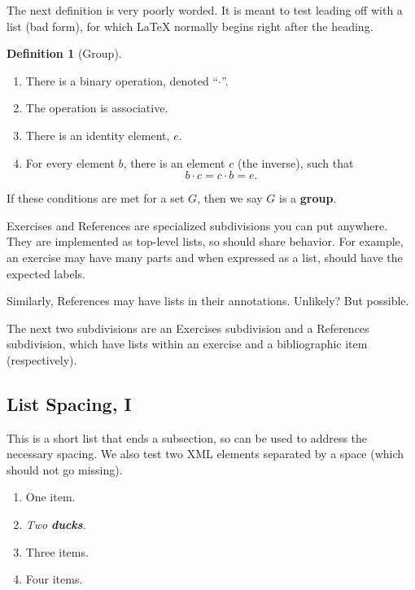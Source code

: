 \documentclass[10pt,]{article}
\newcommand{\alert}[1]{\textbf{\textit{#1}}}
\newcommand{\terminology}[1]{\textbf{#1}}
\theoremstyle{plain}
\theoremstyle{definition}
\newtheorem{definition}[theorem]{Definition}
\theoremstyle{definition}
\theoremstyle{definition}
\theoremstyle{definition}
\theoremstyle{definition}
\theoremstyle{definition}
\numberwithin{equation}{section}
\begin{document}
%
\par
\hypertarget{p-390}{}%
The next definition is very poorly worded.  It is meant to test leading off with a list (bad form), for which \LaTeX{} normally begins right after the heading.%
\begin{definition}[{Group}]\label{definition-2}
\hypertarget{p-391}{}%
\leavevmode%
\begin{enumerate}[label=\alph*)]
\item\hypertarget{li-118}{}There is a binary operation, denoted ``\(\cdot\)''.%
\item\hypertarget{li-119}{}The operation is associative.%
\item\hypertarget{li-120}{}There is an identity element, \(e\).%
\item\hypertarget{li-121}{}\hypertarget{p-392}{}%
For every element \(b\), there is an element \(c\) (the inverse), such that%
\begin{equation*}
b\cdot c=c\cdot b = e\text{.}
\end{equation*}
%
\end{enumerate}
%
\par
\hypertarget{p-393}{}%
If these conditions are met for a set \(G\), then we say \(G\) is a \terminology{group}.%
\end{definition}
\hypertarget{p-394}{}%
Exercises and References are specialized subdivisions you can put anywhere.  They are implemented as top-level lists, so should share behavior.  For example, an exercise may have many parts and when expressed as a list, should have the expected labels.%
\par
\hypertarget{p-395}{}%
Similarly, References may have lists in their annotations.  Unlikely?  But possible.%
\par
\hypertarget{p-396}{}%
The next two subdivisions are an Exercises subdivision and a References subdivision, which have lists within an exercise and a bibliographic item (respectively).%
\typeout{************************************************}
\typeout{************************************************}
\subsection[{List Spacing, I}]{List Spacing, I}\label{subsection-29}
\hypertarget{p-397}{}%
This is a short list that ends a subsection, so can be used to address the necessary spacing.  We also test two XML elements separated by a space (which should not go missing).\leavevmode%
\begin{multicols}{2}
\begin{enumerate}
\item\hypertarget{li-122}{}One item.%
\item\hypertarget{li-123}{}\emph{Two} \alert{ducks}.%
\item\hypertarget{li-124}{}Three items.%
\item\hypertarget{li-125}{}Four items.%
\end{enumerate}
\end{multicols}
%
\typeout{************************************************}
\typeout{************************************************}
\end{document}
